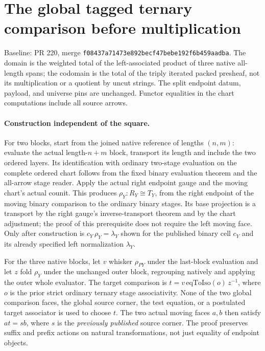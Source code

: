 \section*{The global tagged ternary comparison before multiplication}
Baseline: PR 220, merge \texttt{f08437a71473e892becf47bebe192f6b459aadba}.
The domain is the weighted total of the left-associated product of three
native all-length spans; the codomain is the total of the triply iterated
packed presheaf, not its multiplication or a quotient by uncut strings.
The split endpoint datum, payload, and universe pins are unchanged.
Functor equalities in the chart computations include all source arrows.

\paragraph{Construction independent of the square.} For two blocks, start
from the joined native reference of lengths $(n,m)$: evaluate the actual
length-$n+m$ block, transport its length and include the two ordered
layers. Its identification with ordinary two-stage evaluation on the
complete ordered chart follows from the fixed binary evaluation theorem
and the all-arrow stage reader. Apply the actual right endpoint gauge
and the moving chart's actual counit. This produces
$\rho_Y:R_Y\cong T_Y$, from the right endpoint of the moving binary
comparison to the ordinary binary stages. Its base projection is a
transport by the right gauge's inverse-transport theorem and by the
chart adjustment; the proof of this prerequisite does not require the
left moving face. Only after construction is
$c_Y\,\rho_Y=\lambda_Y$ shown for the published binary cell $c_Y$ and
its already specified left normalization $\lambda_Y$.

For the three native blocks, let $v$ whisker $\rho_{PY}$ under the
last-block evaluation and let $z$ fold $\rho_Y$ under the unchanged
outer block, regrouping natively and applying the outer whole evaluator.
The target comparison is $t=v\,\mathrm{eqToIso}(o)\,z^{-1}$, where
$o$ is the prior strict ordinary ternary stage associativity. None of
the two global comparison faces, the global source corner, the test
equation, or a postulated target associator is used to choose $t$.
The two actual moving faces $a,b$ then satisfy $a t=s b$, where $s$ is
the \emph{previously published} source corner. The proof preserves
suffix and prefix actions on natural transformations, not just equality
of endpoint objects.

